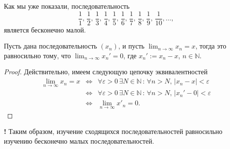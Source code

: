 Как мы уже показали, последовательность 
 \[
      \frac{1}{1}, \,\frac{1}{2}, \,\frac{1}{3}, \, \frac{1}{4}, \, \frac{1}{5}, \, \frac{1}{6},\, \frac{1}{7},\, \frac{1}{8},\, \frac{1}{9},\, \frac{1}{10},  \ldots,
    \]
является бесконечно малой.

\begin{proposition}\label{lim(a_n-a)=0}
    Пусть дана последовательность $(x_n)$, и пусть $\lim_{n\to \infty}x_n = x$, тогда это равносильно тому, что $\lim_{n\to \infty}x_n' = 0$, где $x_n' := x_n - x$, $n\in \mathbb{N}.$
\end{proposition}
\begin{proof}
    Действительно, имеем следующую цепочку эквивалентностей
    \begin{eqnarray*}
      \lim_{n \to \infty} x_n = x & \Longleftrightarrow &  \forall \varepsilon >0\, \exists N \in \mathbb{N}\, :\, \forall n >N, \, |x_n - x| <\varepsilon \\
      &\Longleftrightarrow& \forall \varepsilon >0\, \exists N \in \mathbb{N}\, :\, \forall n >N, \, |x_n' - 0| <\varepsilon \\
      &\Longleftrightarrow &  \lim_{n \to \infty} x'_n = 0.
    \end{eqnarray*}
\end{proof}

\begin{mydanger}{\color{blue}\bf !}
    Таким образом, изучение сходящихся последовательностей равносильно изучению бесконечно малых последовательностей. 
\end{mydanger}


